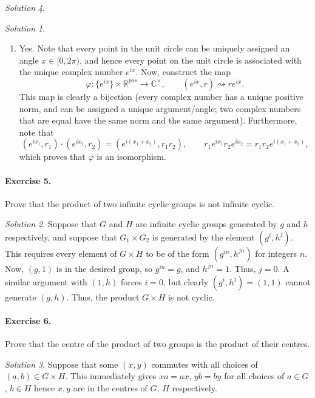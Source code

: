 \documentclass[11pt]{report}
\def\C{\mathbb{C}}
\def\R{\mathbb{R}}
\theoremstyle{remark}
\newtheorem*{solution}{Solution}
\begin{document}
\begin{solution}
\begin{solution}
\begin{enumerate}
        \item Yes. Note that every point in the unit circle can be uniquely assigned
        an angle $x \in [0, 2\pi)$, and hence every point on the unit circle is
        associated with the unique complex number $e^{ix}$. Now, construct the map
        \[
            \varphi\colon \{e^{ix}\}\times \R^{pos} \to \C^\times, \qquad
            (e^{ix}, r) \rightsquigarrow re^{ix}.
        \] This map is clearly a bijection (every complex number has a unique
        positive norm, and can be assigned a unique argument/angle; two complex
        numbers that are equal have the same norm and the same argument).
        Furthermore, note that \[
            (e^{ix_1}, r_1)\cdot (e^{ix_2}, r_2) = (e^{i(x_1 + x_2)}, r_1r_2), \qquad 
            r_1e^{ix_1} r_2e^{ix_2} = r_1r_2 e^{i(x_1 + x_2)},
        \] which proves that $\varphi$ is an isomorphism.
    \end{enumerate}
    \end{solution}
    
    \paragraph{Exercise 5.} Prove that the product of two infinite cyclic groups is
    not infinite cyclic.
    \begin{solution}
        Suppose that $G$ and $H$ are infinite cyclic groups generated by $g$
        and $h$ respectively, and suppose that $G_1 \times G_2$ is generated by
        the element $(g^i, h^j)$. This requires every element of $G\times H$ to be
        of the form $(g^{in}, h^{jn})$ for integers $n$. Now, $(g, 1)$ is in the
        desired group, so $g^{in} = g$, and $h^{jn} = 1$. Thus, $j = 0$. A similar
        argument with $(1, h)$ forces $i = 0$, but clearly $(g^i, h^j) = (1, 1)$
        cannot generate $(g, h)$. Thus, the product $G\times H$ is not cyclic.
    \end{solution}
    
    \paragraph{Exercise 6.} Prove that the centre of the product of two groups is
    the product of their centres.
    \begin{solution}
        Suppose that some $(x, y)$ commutes with all choices of $(a, b) \in G\times
        H$. This immediately gives $xa = ax$, $yb = by$ for all choices of $a \in
        G$, $b \in H$ hence $x, y$ are in the centres of $G$, $H$ respectively.


\end{solution}
\end{solution}
\end{document}
